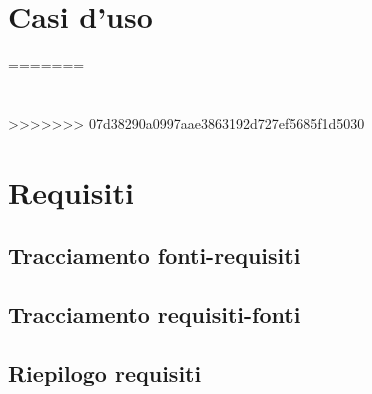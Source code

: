 \documentclass[a4paper,titlepage]{article}
\begin{document}
 \section{Casi d'uso}
  
  
=======
 \section{}
  
  
>>>>>>> 07d38290a0997aae3863192d727ef5685f1d5030
  \newpage
 \section{Requisiti}
  
  
  \subsection{Tracciamento fonti-requisiti}
   
  \subsection{Tracciamento requisiti-fonti}
   
  \subsection{Riepilogo requisiti}
   
\end{document}
